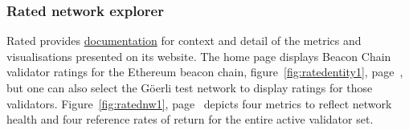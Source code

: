 \documentclass[UTF8]{article}
\begin{document}
\subsubsection*{Rated network explorer}
Rated provides \href{https://docs.rated.network}{documentation} for context and detail of the metrics and visualisations presented on its website.
	 The home page displays Beacon Chain validator ratings for the Ethereum beacon chain, figure~\ref{fig:ratedentity1}, page~\pageref{fig:ratedentity1}, but one can also select the G\"oerli test network to display ratings for those validators.
Figure~\ref{fig:ratednw1}, page~\pageref{fig:ratednw1} depicts four metrics to reflect network health and four reference rates of return for the entire active validator set.


\end{document}
